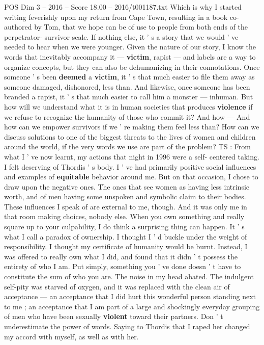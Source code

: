 \begin{textsample}{POS Dim 3 – 2016 – Score 18.00 – 2016/t001187.txt}
Which is why I started writing feverishly upon my return from Cape Town, resulting in a book co-authored by Tom, that we hope can be of use to people from both ends of the perpetrator- survivor scale.
If nothing else, it ' s a story that we would ' ve needed to hear when we were younger.
Given the nature of our story, I know the words that inevitably accompany it — \textbf{victim}, rapist — and labels are a way to organize concepts, but they can also be dehumanizing in their connotations.
Once someone ' s been \textbf{deemed} a \textbf{victim}, it ' s that much easier to file them away as someone damaged, dishonored, less than.
And likewise, once someone has been branded a rapist, it ' s that much easier to call him a monster — inhuman.
But how will we understand what it is in human societies that produces \textbf{violence} if we refuse to recognize the humanity of those who commit it?
And how — And how can we empower survivors if we ' re making them feel less than?
How can we discuss solutions to one of the biggest threats to the lives of women and children around the world, if the very words we use are part of the problem?
TS : From what I ' ve now learnt, my actions that night in 1996 were a self- centered taking.
I felt deserving of Thordis ' s body.
I ' ve had primarily positive social influences and examples of \textbf{equitable} behavior around me.
But on that occasion, I chose to draw upon the negative ones.
The ones that see women as having less intrinsic worth, and of men having some unspoken and symbolic claim to their bodies.
These influences I speak of are external to me, though.
And it was only me in that room making choices, nobody else.
When you own something and really square up to your culpability, I do think a surprising thing can happen.
It ' s what I call a paradox of ownership.
I thought I ' d buckle under the weight of responsibility.
I thought my certificate of humanity would be burnt.
Instead, I was offered to really own what I did, and found that it didn ' t possess the entirety of who I am.
Put simply, something you ' ve done doesn ' t have to constitute the sum of who you are.
The noise in my head abated.
The indulgent self-pity was starved of oxygen, and it was replaced with the clean air of acceptance — an acceptance that I did hurt this wonderful person standing next to me ; an acceptance that I am part of a large and shockingly everyday grouping of men who have been sexually \textbf{violent} toward their partners.
Don ' t underestimate the power of words.
Saying to Thordis that I raped her changed my accord with myself, as well as with her.

\end{textsample}
